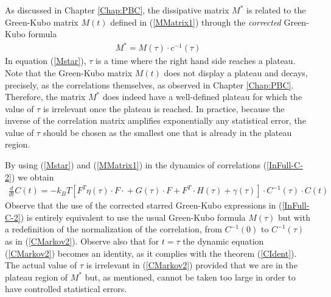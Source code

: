 \documentclass[b5paper,openright,10pt]{book}
\newcommand{\esc}{\!\cdot\!}
\begin{document}
As  discussed  in Chapter \ref{Chap:PBC},
the  dissipative matrix  $M^*$  is
related to  the Green-Kubo  matrix $M(t)$ defined  in (\ref{MMatrix1})
through the \textit{corrected} Green-Kubo formula
\begin{align}
  M^*=M(\tau)\esc c^{-1}(\tau)
\label{Mstar}
\end{align}
In  equation  (\ref{Mstar}),
$\tau$ is  a time where  the right hand  side reaches a  plateau. Note
that  the Green-Kubo  matrix $M(t)$  does  not display  a plateau  and
decays,  precisely, as  the  correlations themselves,  as observed  in
Chapter \ref{Chap:PBC}.  Therefore,  the  matrix  $M^*$  does  indeed  have  a
well-defined plateau for which the  value of $\tau$ is irrelevant once
the  plateau is  reached.  In  practice,  because the  inverse of  the
correlation matrix amplifies exponentially  any statistical error, the
value of $\tau$  should be chosen as the smallest  one that is already
in the plateau region.

By   using    (\ref{Mstar}) and (\ref{MMatrix1})   in   the   dynamics    of   correlations
(\ref{InFull-C-2}) we obtain
\begin{align}
\frac{d}{dt}C(t) =
-k_BT\left[{F}^T{\eta}(\tau)\esc{F}\esc  +{G}(\tau)\esc F+F^T\esc{H}(\tau)+{\gamma}(\tau)\right]
\esc C^{-1}(\tau) \esc C(t)
\label{CMarkov2}
\end{align}
Observe that the  use of the corrected starred  Green-Kubo expressions in
(\ref{InFull-C-2}) is  entirely equivalent  to use the  usual Green-Kubo
formula $M(\tau)$ but with a redefinition of the normalization of the
correlation,    from    $C^{-1}(0)$    to   $C^{-1}(\tau)$    as    in
(\ref{CMarkov2}).   Observe  also  that  for  $t=\tau$  the  dynamic
equation (\ref{CMarkov2}) becomes an identity, as  it complies with  the theorem
(\ref{CIdent}).   The   actual  value  of  $\tau$   is  irrelevant  in
(\ref{CMarkov2}) provided that  we are in the plateau  region of $M^*$
but,  as  mentioned, cannot  be  taken  too  large  in order  to  have
controlled statistical errors.
\end{document}
